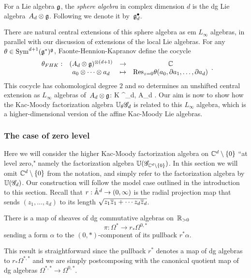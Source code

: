 \begin{dfn}
For a Lie algebra $\mathfrak g$, the {\em sphere algebra} in complex dimension $d$ is the dg Lie algebra~$A_d \otimes \mathfrak g$.
Following \cite{FHK} we denote it by~$\mathfrak g^\bullet_d$.
\end{dfn}

There are natural central extensions of this sphere algebra as {em $L_\infty$ algebras},
in parallel with our discussion of extensions of the local Lie algebras.
For any $\theta \in {\rm Sym}^{d+1}(\mathfrak g^*)^\mathfrak g$, Faonte-Hennion-Kapranov define the cocycle
\[
\label{fhk cocycle}
\begin{array}{cccc}
\theta_{FHK} : & (A_d \otimes \mathfrak g)^{\otimes (d+1)} & \to & \mathbb C\\ 
& a_0 \otimes \cdots \otimes a_d & \mapsto & {\rm Res}_{z=0} \theta(a_0,\partial a_1,\ldots,\partial a_d)
\end{array}.
\]
This cocycle has cohomological degree $2$ and so determines an unshifted central extension as $L_\infty$ algebras of~$A_d \otimes \mathfrak g$:
\beqn\label{gdt}
\CC \cdot K \to \widetilde{\fg}^\bullet_{d, \theta} \to A_d \tensor \fg .
\eeqn
Our aim is now to show how the Kac-Moody factorization algebra $\mathbb U_\theta \mathscr G_d$ is related to this $L_\infty$ algebra,
which is a higher-dimensional version of the affine Kac-Moody Lie algebras. 

\subsubsection{The case of zero level}

Here we will consider the higher Kac-Moody factorization algebra on $\mathbb C^d \setminus \{0\}$ ``at level zero," namely the factorization algebra $\mathbb U(\mathscr G_{\mathbb C^d \setminus\{0\}})$.
In this section we will omit $\mathbb C^d \setminus \{0\}$ from the notation, and simply refer to the factorization algebra by $\mathbb U(\mathscr G_d)$. 
Our construction will follow the model case outlined in the introduction to this section.
Recall that $r: \mathring{\mathbb A}^d \to (0,\infty)$ is the radial projection map that sends $(z_1,\ldots,z_d)$ to its length $\sqrt{z_1\overline{z}_1 + \cdots z_d \overline{z}_d}$.

\begin{lem}
There is a map of sheaves of dg commutative algebras on~$\mathbb R_{>0}$
\[
\pi: \Omega^* \to r_* \Omega^{0,*}
\]
sending a form $\alpha$ to the $(0,*)$-component of its pullback $r^*\alpha$.
\end{lem}

This result is straightforward since the pullback $r^*$ denotes a map of dg algebras to $r_* \Omega^{*,*}$ and we are simply postcomposing with the canonical quotient map of dg algebras $\Omega^{*,*} \to \Omega^{0,*}$. 

